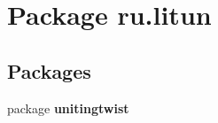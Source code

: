 \section{Package ru.\+litun}
\label{namespaceru_1_1litun}
\subsection*{Packages}
\begin{DoxyCompactItemize}
\item 
package \textbf{ unitingtwist}
\end{DoxyCompactItemize}

